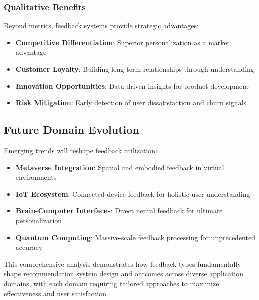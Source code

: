 \subsubsection{Qualitative Benefits}

Beyond metrics, feedback systems provide strategic advantages:

\begin{itemize}
    \item \textbf{Competitive Differentiation}: Superior personalization as a market advantage
    \item \textbf{Customer Loyalty}: Building long-term relationships through understanding
    \item \textbf{Innovation Opportunities}: Data-driven insights for product development
    \item \textbf{Risk Mitigation}: Early detection of user dissatisfaction and churn signals
\end{itemize}

\subsection{Future Domain Evolution}

Emerging trends will reshape feedback utilization:

\begin{itemize}
    \item \textbf{Metaverse Integration}: Spatial and embodied feedback in virtual environments
    \item \textbf{IoT Ecosystem}: Connected device feedback for holistic user understanding
    \item \textbf{Brain-Computer Interfaces}: Direct neural feedback for ultimate personalization
    \item \textbf{Quantum Computing}: Massive-scale feedback processing for unprecedented accuracy
\end{itemize}

This comprehensive analysis demonstrates how feedback types fundamentally shape recommendation system design and outcomes across diverse application domains, with each domain requiring tailored approaches to maximize effectiveness and user satisfaction.
